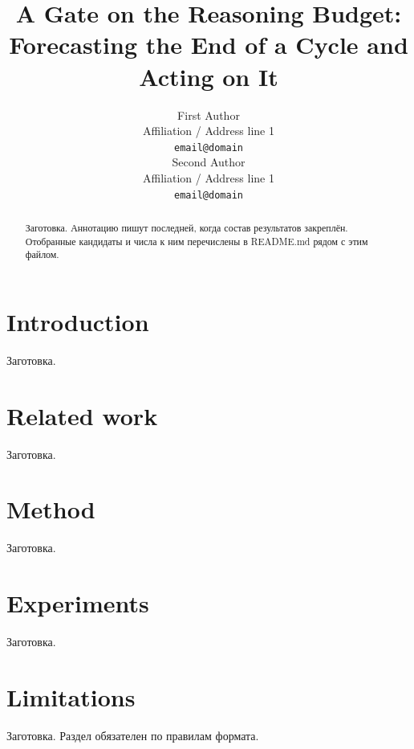 \documentclass[11pt]{article}
\title{A Gate on the Reasoning Budget: Forecasting the End of a Cycle and Acting on It}
\author{First Author \\
  Affiliation / Address line 1 \\
  \texttt{email@domain} \\\And
  Second Author \\
  Affiliation / Address line 1 \\
  \texttt{email@domain} \\}
\begin{document}
\maketitle

\begin{abstract}
Заготовка. Аннотацию пишут последней, когда состав результатов закреплён.
Отобранные кандидаты и числа к ним перечислены в README.md рядом с этим файлом.
\end{abstract}

\section{Introduction}

Заготовка.

\section{Related work}

Заготовка.

\section{Method}

Заготовка.

\section{Experiments}

Заготовка.

\section{Limitations}

Заготовка. Раздел обязателен по правилам формата.



\end{document}
